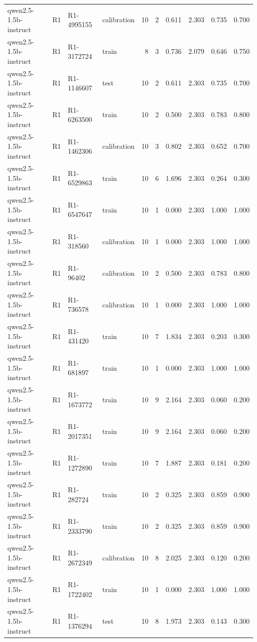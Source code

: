 \begin{table}
\begin{tabular}{llllrrrrrr}
qwen2.5-1.5b-instruct & R1 & R1-4995155 & calibration & 10 & 2 & 0.611 & 2.303 & 0.735 & 0.700 \\
qwen2.5-1.5b-instruct & R1 & R1-3172724 & train & 8 & 3 & 0.736 & 2.079 & 0.646 & 0.750 \\
qwen2.5-1.5b-instruct & R1 & R1-1146607 & test & 10 & 2 & 0.611 & 2.303 & 0.735 & 0.700 \\
qwen2.5-1.5b-instruct & R1 & R1-6263500 & train & 10 & 2 & 0.500 & 2.303 & 0.783 & 0.800 \\
qwen2.5-1.5b-instruct & R1 & R1-1462306 & calibration & 10 & 3 & 0.802 & 2.303 & 0.652 & 0.700 \\
qwen2.5-1.5b-instruct & R1 & R1-6529863 & train & 10 & 6 & 1.696 & 2.303 & 0.264 & 0.300 \\
qwen2.5-1.5b-instruct & R1 & R1-6547647 & train & 10 & 1 & 0.000 & 2.303 & 1.000 & 1.000 \\
qwen2.5-1.5b-instruct & R1 & R1-318560 & calibration & 10 & 1 & 0.000 & 2.303 & 1.000 & 1.000 \\
qwen2.5-1.5b-instruct & R1 & R1-96402 & calibration & 10 & 2 & 0.500 & 2.303 & 0.783 & 0.800 \\
qwen2.5-1.5b-instruct & R1 & R1-736578 & calibration & 10 & 1 & 0.000 & 2.303 & 1.000 & 1.000 \\
qwen2.5-1.5b-instruct & R1 & R1-431420 & train & 10 & 7 & 1.834 & 2.303 & 0.203 & 0.300 \\
qwen2.5-1.5b-instruct & R1 & R1-681897 & train & 10 & 1 & 0.000 & 2.303 & 1.000 & 1.000 \\
qwen2.5-1.5b-instruct & R1 & R1-1673772 & train & 10 & 9 & 2.164 & 2.303 & 0.060 & 0.200 \\
qwen2.5-1.5b-instruct & R1 & R1-2017351 & train & 10 & 9 & 2.164 & 2.303 & 0.060 & 0.200 \\
qwen2.5-1.5b-instruct & R1 & R1-1272890 & train & 10 & 7 & 1.887 & 2.303 & 0.181 & 0.200 \\
qwen2.5-1.5b-instruct & R1 & R1-282724 & train & 10 & 2 & 0.325 & 2.303 & 0.859 & 0.900 \\
qwen2.5-1.5b-instruct & R1 & R1-2333790 & train & 10 & 2 & 0.325 & 2.303 & 0.859 & 0.900 \\
qwen2.5-1.5b-instruct & R1 & R1-2672349 & calibration & 10 & 8 & 2.025 & 2.303 & 0.120 & 0.200 \\
qwen2.5-1.5b-instruct & R1 & R1-1722402 & train & 10 & 1 & 0.000 & 2.303 & 1.000 & 1.000 \\
qwen2.5-1.5b-instruct & R1 & R1-1376294 & test & 10 & 8 & 1.973 & 2.303 & 0.143 & 0.300 \\

\end{tabular}
\end{table}
